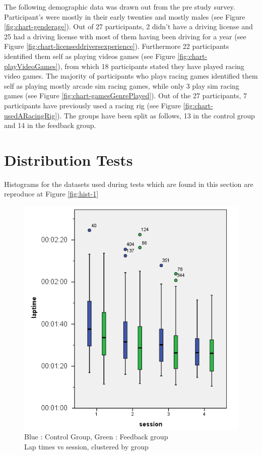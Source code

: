 The following demographic data was drawn out from the pre study survey. Participant's were mostly in their early twenties and mostly males (see Figure \ref{fig:chart-genderage}). Out of 27 participants, 2 didn't have a driving license and 25 had a driving license with most of them having been driving for a year (see Figure \ref{fig:chart-licenseddriversexperience}). Furthermore 22 participants identified them self as playing videos games (see Figure \ref{fig:chart-playVideoGames}), from which 18 participants stated they have played racing video games. The majority of participants who plays racing games identified them self as playing mostly arcade sim racing games, while only 3 play sim racing games (see Figure \ref{fig:chart-gamesGenrePlayed}). Out of the 27 participants, 7 participants have previously used a racing rig (see Figure \ref{fig:chart-usedARacingRig}). The groups have been split as follows, 13 in the control group and 14 in the feedback group.

\section{Distribution Tests}
\label{sec:eval-distTests}

Histograms for the datasets used during tests which are found in this section are reproduce at Figure \ref{fig:hist-1}

\begin{figure}[!htb]
	\centering
	\includegraphics[width=\textwidth]{charts/laptimes.png}
	\caption[Lap times vs session, clustered by group]{Blue : Control Group, Green : Feedback group \\ Lap times vs session, clustered by group}
	\label{fig:chart-laptimes}
\end{figure}

